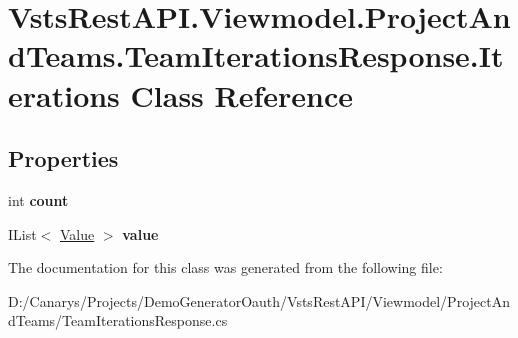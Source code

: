 \hypertarget{class_vsts_rest_a_p_i_1_1_viewmodel_1_1_project_and_teams_1_1_team_iterations_response_1_1_iterations}{}\section{Vsts\+Rest\+A\+P\+I.\+Viewmodel.\+Project\+And\+Teams.\+Team\+Iterations\+Response.\+Iterations Class Reference}
\label{class_vsts_rest_a_p_i_1_1_viewmodel_1_1_project_and_teams_1_1_team_iterations_response_1_1_iterations}
\subsection*{Properties}
\begin{DoxyCompactItemize}
\item 
\mbox{\label{class_vsts_rest_a_p_i_1_1_viewmodel_1_1_project_and_teams_1_1_team_iterations_response_1_1_iterations_a54db76fe063397795c904a2c0436454f}} 
int {\bfseries count}
\item 
\mbox{\label{class_vsts_rest_a_p_i_1_1_viewmodel_1_1_project_and_teams_1_1_team_iterations_response_1_1_iterations_afab0780afc84be7c46ca7bb8965452b7}} 
I\+List$<$ \mbox{\hyperlink{class_vsts_rest_a_p_i_1_1_viewmodel_1_1_project_and_teams_1_1_team_iterations_response_1_1_value}{Value}} $>$ {\bfseries value}
\end{DoxyCompactItemize}


The documentation for this class was generated from the following file\+:\begin{DoxyCompactItemize}
\item 
D\+:/\+Canarys/\+Projects/\+Demo\+Generator\+Oauth/\+Vsts\+Rest\+A\+P\+I/\+Viewmodel/\+Project\+And\+Teams/Team\+Iterations\+Response.\+cs\end{DoxyCompactItemize}
